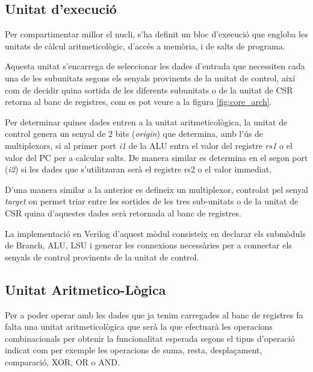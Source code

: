 \documentclass[10pt,a4paper,twocolumn,twoside]{article}
\begin{document}
    
    
    \subsection{Unitat d'execució}
    Per compartimentar millor el nucli, s'ha definit un bloc d'execució que engloba les unitats de càlcul aritmeticològic, d'accés a memòria, i de salts de programa.
    
    Aquesta unitat s'encarrega de seleccionar les dades d'entrada que necessiten cada una de les subunitats segons els senyals provinents de la unitat de control, així com de decidir quina sortida de les diferents subunitats o de la unitat de CSR retorna al banc de registres, com es pot veure a la figura \ref{fig:core_arch}.
    
    Per determinar quines dades entren a la unitat aritmeticològica, la unitat de control genera un senyal de 2 bits (\textit{origin}) que determina, amb l'ús de multiplexors, si al primer port \textit{i1} de la ALU entra el valor del registre \textit{rs1} o el valor del PC per a calcular salts. De manera similar es determina en el segon port (\textit{i2}) si les dades que s'utilitzaran serà el registre rs2 o el valor immediat.
    
    D'una manera similar a la anterior es defineix un multiplexor, controlat pel senyal \textit{target} on permet triar entre les sortides de les tres sub-unitats o de la unitat de CSR quina d'aquestes dades serà retornada al banc de registres.
    
    La implementació en Verilog d'aquest mòdul consisteix en declarar els submòduls de Branch, ALU, LSU i generar les connexions necessàries per a connectar els senyals de control provinents de la unitat de control. 
    

    
    
    
    
    

    
    
    \subsection{Unitat Aritmetico-Lògica}
    Per a poder operar amb les dades que ja tenim carregades al banc de registres fa falta una unitat aritmeticològica que serà la que efectuarà les operacions combinacionals per obtenir la funcionalitat esperada segons el tipus d'operació indicat com per exemple  les operacions de suma, resta, desplaçament, comparació, XOR, OR o AND.
    
\end{document}
